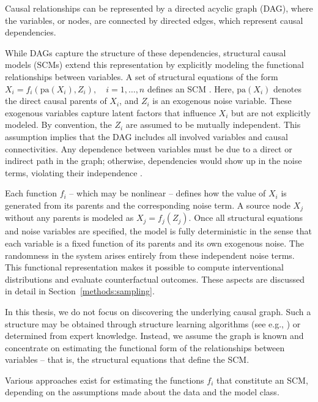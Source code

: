 Causal relationships can be represented by a directed acyclic graph (DAG), where the variables, or nodes, are connected by directed edges, which represent causal dependencies.

While DAGs capture the structure of these dependencies, structural causal models (SCMs) extend this representation by explicitly modeling the functional relationships between variables. A set of structural equations of the form $X_i = f_i(\text{pa}(X_i), Z_i), \quad i = 1, \dots, n$ defines an SCM \citep{pearl_book2009}. Here, $\text{pa}(X_i)$ denotes the direct causal parents of $X_i$, and $Z_i$ is an exogenous noise variable. These exogenous variables capture latent factors that influence $X_i$ but are not explicitly modeled. By convention, the $Z_i$ are assumed to be mutually independent. This assumption implies that the DAG includes all involved variables and causal connectivities. Any dependence between variables must be due to a direct or indirect path in the graph; otherwise, dependencies would show up in the noise terms, violating their independence \citep{pearl_book2009}.

Each function $f_i$ -- which may be nonlinear -- defines how the value of $X_i$ is generated from its parents and the corresponding noise term. A source node $X_j$ without any parents is modeled as $X_j = f_j(Z_j)$. Once all structural equations and noise variables are specified, the model is fully deterministic in the sense that each variable is a fixed function of its parents and its own exogenous noise. The randomness in the system arises entirely from these independent noise terms. This functional representation makes it possible to compute interventional distributions and evaluate counterfactual outcomes. These aspects are discussed in detail in Section~\ref{methods:sampling}.

In this thesis, we do not focus on discovering the underlying causal graph. Such a structure may be obtained through structure learning algorithms (see e.g., \citealp{zheng2018}) or determined from expert knowledge. Instead, we assume the graph is known and concentrate on estimating the functional form of the relationships between variables -- that is, the structural equations that define the SCM.

Various approaches exist for estimating the functions $f_i$ that constitute an SCM, depending on the assumptions made about the data and the model class.




